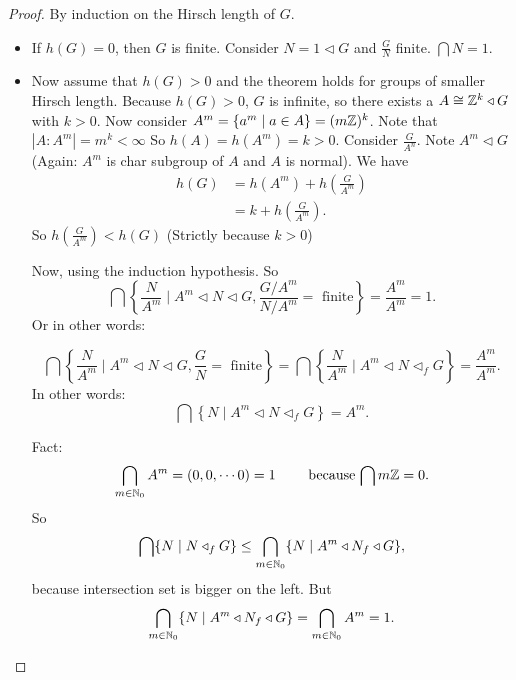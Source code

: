 \begin{proof}
    By induction on the Hirsch length of $G$.

    \begin{itemize}
        \item If $h(G) =0$, then  $G$ is finite. Consider $N=1 \triangleleft G$ and $\frac{G}{N}$ finite. $ \bigcap N = 1 $.
        \item Now assume that $h(G) > 0$ and the theorem holds for groups of smaller Hirsch length.
            Because $h(G) > 0$,  $G$ is infinite, so there exists a  $A \cong \mathbb{Z}^{k} \triangleleft G$ with $k>0$.
            Now consider $A^{m} = \{a^{m}  \mid  a \in A\} = (m\mathbb{Z})^{k} $.
            Note that $|A : A^{m}| = m^{k} < \infty$
            So $h(A) = h(A^{m}) = k > 0$.
            Consider $\frac{G}{A^{n}}$. Note $A^{m} \triangleleft G$ (Again: $A^{m}$ is char subgroup of $A$ and $A$ is normal).
            We have
            \begin{align*}
                h(G) &= h(A^{m}) + h\left(\frac{G}{A^{m}}\right)\\
                     &= k + h\left(\frac{G}{A^{m}}\right)
            .\end{align*} 
            So $h(\frac{G}{A^{m}}) < h(G)$ (Strictly because $k > 0$)

            Now, using the induction hypothesis. 
            So
            \[
                \bigcap \left\{\frac{N}{A^{m}} \mid A^{m} \triangleleft  N \triangleleft  G , \frac{G / A^{m}}{N / A^{m}} = \text{ finite}\right\}  = \frac{A^{m}}{A^{m}} = 1
            .\] 
            Or in other words:

            \[
                \bigcap \left\{\frac{N}{A^{m}} \mid A^{m} \triangleleft  N \triangleleft  G , \frac{G }{N} = \text{ finite}\right\}  =
                \bigcap \left\{\frac{N}{A^{m}} \mid A^{m} \triangleleft  N \triangleleft_f  G\right\}  = \frac{A^{m}}{A^{m}}
            .\] 
            In other words:
            \[
                \bigcap \left\{N \mid A^{m} \triangleleft  N \triangleleft_f  G\right\}  = A^{m}
            .\] 

            Fact: 
            \[
                \bigcap_{m \in \mathbb{N}_0} A^{m} = (0, 0, \cdots 0) = 1 \qquad \text{ because $\bigcap m \mathbb{Z} = 0 $}
            .\] 
            So
            \[
            \bigcap \{N  \mid  N \triangleleft_f G\}  \le  \bigcap_{m \in \mathbb{N}_0} \{N  \mid A^{m} \triangleleft  N_f \triangleleft G\}  
            ,\] 
            because intersection set is bigger on the left.
            But
            \[
            \bigcap_{m \in \mathbb{N}_0} \{N  \mid A^{m} \triangleleft  N_f \triangleleft G\}   = 
            \bigcap_{m \in \mathbb{N}_0} A^{m} = 1
            .\] 
    \end{itemize}

\end{proof}


